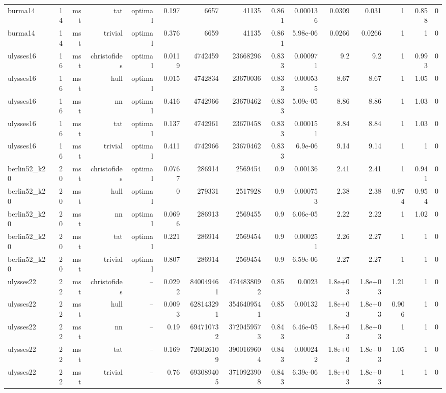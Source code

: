 \begin{tabular}{lrrrrrrrrrrrrrr}
burma14 & 14 & mst & tat & optimal & 0.197 & 6657 & 41135 & 0.861 & 0.000136 & 0.0309 & 0.031 & 1 & 0.858 & 0 \\
burma14 & 14 & mst & trivial & optimal & 0.376 & 6659 & 41135 & 0.861 & 5.98e-06 & 0.0266 & 0.0266 & 1 & 1 & 0 \\
ulysses16 & 16 & mst & christofides & optimal & 0.0119 & 4742459 & 23668296 & 0.833 & 0.000971 & 9.2 & 9.2 & 1 & 0.993 & 0 \\
ulysses16 & 16 & mst & hull & optimal & 0.015 & 4742834 & 23670036 & 0.833 & 0.000535 & 8.67 & 8.67 & 1 & 1.05 & 0 \\
ulysses16 & 16 & mst & nn & optimal & 0.416 & 4742966 & 23670462 & 0.833 & 5.09e-05 & 8.86 & 8.86 & 1 & 1.03 & 0 \\
ulysses16 & 16 & mst & tat & optimal & 0.137 & 4742961 & 23670458 & 0.833 & 0.000151 & 8.84 & 8.84 & 1 & 1.03 & 0 \\
ulysses16 & 16 & mst & trivial & optimal & 0.411 & 4742966 & 23670462 & 0.833 & 6.9e-06 & 9.14 & 9.14 & 1 & 1 & 0 \\
berlin52\_k20 & 20 & mst & christofides & optimal & 0.0767 & 286914 & 2569454 & 0.9 & 0.00136 & 2.41 & 2.41 & 1 & 0.941 & 0 \\
berlin52\_k20 & 20 & mst & hull & optimal & 0 & 279331 & 2517928 & 0.9 & 0.000753 & 2.38 & 2.38 & 0.974 & 0.954 & 0 \\
berlin52\_k20 & 20 & mst & nn & optimal & 0.0696 & 286913 & 2569455 & 0.9 & 6.06e-05 & 2.22 & 2.22 & 1 & 1.02 & 0 \\
berlin52\_k20 & 20 & mst & tat & optimal & 0.221 & 286914 & 2569454 & 0.9 & 0.000251 & 2.26 & 2.27 & 1 & 1 & 0 \\
berlin52\_k20 & 20 & mst & trivial & optimal & 0.807 & 286914 & 2569454 & 0.9 & 6.59e-06 & 2.27 & 2.27 & 1 & 1 & 0 \\
ulysses22 & 22 & mst & christofides & -- & 0.0292 & 840049461 & 4744838092 & 0.85 & 0.0023 & 1.8e+03 & 1.8e+03 & 1.21 & 1 & 0 \\
ulysses22 & 22 & mst & hull & -- & 0.0093 & 628143291 & 3546409541 & 0.85 & 0.00132 & 1.8e+03 & 1.8e+03 & 0.906 & 1 & 0 \\
ulysses22 & 22 & mst & nn & -- & 0.19 & 694710732 & 3720459573 & 0.843 & 6.46e-05 & 1.8e+03 & 1.8e+03 & 1 & 1 & 0 \\
ulysses22 & 22 & mst & tat & -- & 0.169 & 726026109 & 3900169604 & 0.843 & 0.000242 & 1.8e+03 & 1.8e+03 & 1.05 & 1 & 0 \\
ulysses22 & 22 & mst & trivial & -- & 0.76 & 693089405 & 3710923908 & 0.843 & 6.39e-06 & 1.8e+03 & 1.8e+03 & 1 & 1 & 0 \\

\end{tabular}
